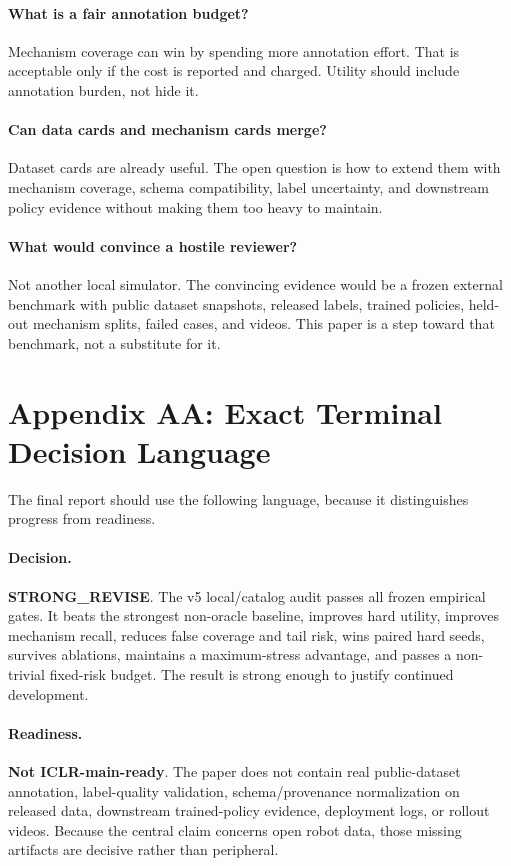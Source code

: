 \documentclass{article}
\begin{document}
\paragraph{What is a fair annotation budget?}
Mechanism coverage can win by spending more annotation effort. That is acceptable only if the cost is reported and charged. Utility should include annotation burden, not hide it.

\paragraph{Can data cards and mechanism cards merge?}
Dataset cards are already useful. The open question is how to extend them with mechanism coverage, schema compatibility, label uncertainty, and downstream policy evidence without making them too heavy to maintain.

\paragraph{What would convince a hostile reviewer?}
Not another local simulator. The convincing evidence would be a frozen external benchmark with public dataset snapshots, released labels, trained policies, held-out mechanism splits, failed cases, and videos. This paper is a step toward that benchmark, not a substitute for it.

\section*{Appendix AA: Exact Terminal Decision Language}
The final report should use the following language, because it distinguishes progress from readiness.

\paragraph{Decision.}
\textbf{STRONG\_REVISE}. The v5 local/catalog audit passes all frozen empirical gates. It beats the strongest non-oracle baseline, improves hard utility, improves mechanism recall, reduces false coverage and tail risk, wins paired hard seeds, survives ablations, maintains a maximum-stress advantage, and passes a non-trivial fixed-risk budget. The result is strong enough to justify continued development.

\paragraph{Readiness.}
\textbf{Not ICLR-main-ready}. The paper does not contain real public-dataset annotation, label-quality validation, schema/provenance normalization on released data, downstream trained-policy evidence, deployment logs, or rollout videos. Because the central claim concerns open robot data, those missing artifacts are decisive rather than peripheral.
\end{document}
